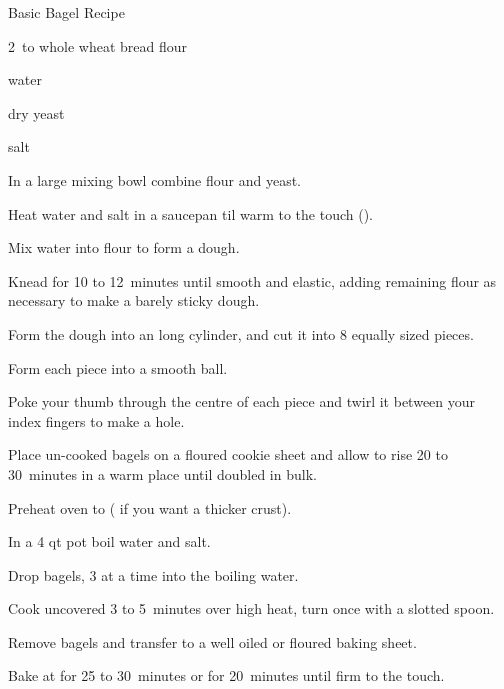 \begin{recipe}{Basic Bagel Recipe}{}{}

\begin{ingredients}
\item 2\half\ to  whole wheat bread flour
\item \C{1\quarter} water
\item {} dry yeast
\item {} salt
\end{ingredients}

\begin{directions}
\item In a large mixing bowl combine flour and yeast.
\item Heat water and salt in a saucepan til warm to the touch ().
\item Mix water into flour to form a dough.
\item Knead for 10 to 12~minutes until smooth and elastic, adding remaining flour as necessary to make a barely sticky dough.
\item Form the dough into an  long cylinder, and cut it into 8 equally sized pieces.
\item Form each piece into a smooth ball.
\item Poke your thumb through the centre of each piece and twirl it between your index fingers to make a hole.
\item Place un-cooked bagels on a floured cookie sheet and allow to rise 20 to 30~minutes in a warm place until doubled in bulk.
\item Preheat oven to  ( if you want a thicker crust).
\item In a 4 qt pot boil  water and \tp{\half} salt.
\item Drop bagels, 3 at a time into the boiling water.
\item Cook uncovered 3 to 5~minutes over high heat, turn once with a slotted spoon.
\item Remove bagels and transfer to a well oiled or floured baking sheet.
\item Bake at  for 25 to 30~minutes or  for 20~minutes until firm to the touch.
\end{directions}
\end{recipe}
